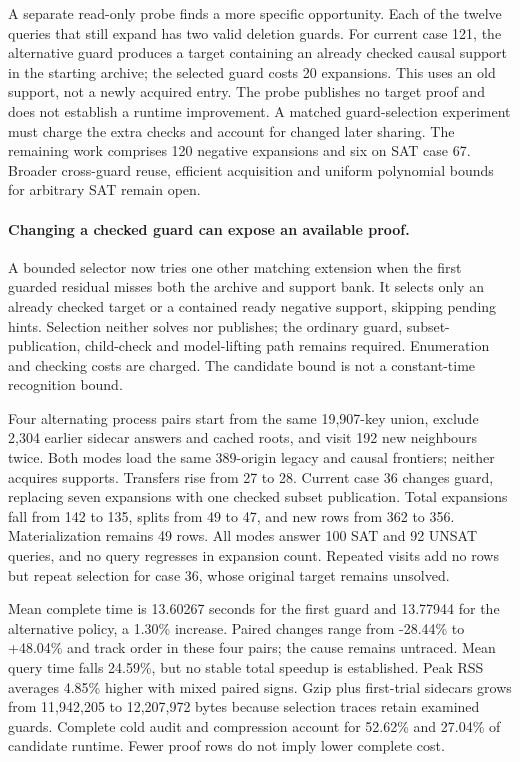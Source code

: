\documentclass[11pt,a4paper]{article}
\numberwithin{equation}{section}
\theoremstyle{plain}
\theoremstyle{definition}
\theoremstyle{remark}
\begin{document}
A separate read-only probe finds a more specific opportunity. Each of the twelve
queries that still expand has two valid deletion guards. For current case 121,
the alternative guard produces a target containing an already checked causal
support in the starting archive; the selected guard costs 20 expansions. This
uses an old support, not a newly acquired entry. The probe publishes no target
proof and does not establish a runtime improvement. A matched guard-selection
experiment must charge the extra checks and account for changed later sharing.
The remaining work comprises 120 negative expansions and six on SAT case 67.
Broader cross-guard reuse, efficient acquisition and uniform polynomial bounds
for arbitrary SAT remain open.

\paragraph{Changing a checked guard can expose an available proof.}
A bounded selector now tries one other matching extension when the first guarded
residual misses both the archive and support bank. It selects only an already
checked target or a contained ready negative support, skipping pending hints.
Selection neither solves nor publishes; the ordinary guard, subset-publication,
child-check and model-lifting path remains required. Enumeration and checking
costs are charged. The candidate bound is not a constant-time recognition bound.

Four alternating process pairs start from the same 19,907-key union, exclude
2,304 earlier sidecar answers and cached roots, and visit 192 new neighbours
twice. Both modes load the same 389-origin legacy and causal frontiers; neither
acquires supports. Transfers rise from 27 to 28. Current case 36 changes guard,
replacing seven expansions with one checked subset publication. Total expansions
fall from 142 to 135, splits from 49 to 47, and new rows from 362 to 356.
Materialization remains 49 rows. All modes answer 100 SAT and 92 UNSAT queries,
and no query regresses in expansion count. Repeated visits add no rows but repeat
selection for case 36, whose original target remains unsolved.

Mean complete time is 13.60267 seconds for the first guard and 13.77944 for the
alternative policy, a 1.30\% increase. Paired changes range from -28.44\% to
+48.04\% and track order in these four pairs; the cause remains untraced.
Mean query time falls 24.59\%, but no stable total speedup is established.
Peak RSS averages 4.85\% higher with mixed paired signs. Gzip plus first-trial
sidecars grows from 11,942,205 to 12,207,972 bytes because selection traces retain
examined guards. Complete cold audit and compression account for 52.62\% and
27.04\% of candidate runtime. Fewer proof rows do not imply lower complete cost.
\end{document}
